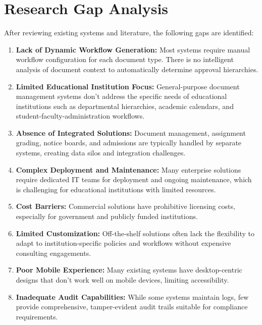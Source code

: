 \section{Research Gap Analysis}

After reviewing existing systems and literature, the following gaps are identified:

\begin{enumerate}
\item \textbf{Lack of Dynamic Workflow Generation:} Most systems require manual workflow configuration for each document type. There is no intelligent analysis of document context to automatically determine approval hierarchies.

\item \textbf{Limited Educational Institution Focus:} General-purpose document management systems don't address the specific needs of educational institutions such as departmental hierarchies, academic calendars, and student-faculty-administration workflows.

\item \textbf{Absence of Integrated Solutions:} Document management, assignment grading, notice boards, and admissions are typically handled by separate systems, creating data silos and integration challenges.

\item \textbf{Complex Deployment and Maintenance:} Many enterprise solutions require dedicated IT teams for deployment and ongoing maintenance, which is challenging for educational institutions with limited resources.

\item \textbf{Cost Barriers:} Commercial solutions have prohibitive licensing costs, especially for government and publicly funded institutions.

\item \textbf{Limited Customization:} Off-the-shelf solutions often lack the flexibility to adapt to institution-specific policies and workflows without expensive consulting engagements.

\item \textbf{Poor Mobile Experience:} Many existing systems have desktop-centric designs that don't work well on mobile devices, limiting accessibility.

\item \textbf{Inadequate Audit Capabilities:} While some systems maintain logs, few provide comprehensive, tamper-evident audit trails suitable for compliance requirements.
\end{enumerate}

